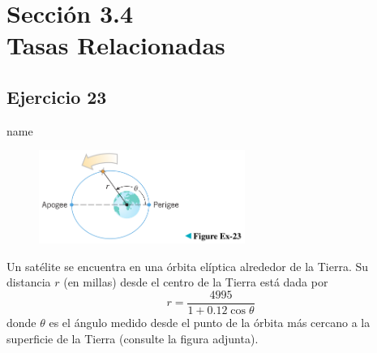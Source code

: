 \documentclass[12pt]{article}
\begin{document}
\section{Sección 3.4 \\ Tasas Relacionadas} 
\subsection{Ejercicio 23} name \\

\begin{figure}[H]
\centering
\includegraphics[width=0.6\textwidth]{../img/img_Lista3/23.png}
\end{figure}
Un satélite se encuentra en una órbita elíptica alrededor de la Tierra. Su distancia $r$ (en millas) desde el centro de la Tierra está dada por
\[
r=\frac{4995}{1+0.12\cos{\theta}}
\]
donde $\theta$ es el ángulo medido desde el punto de la órbita más cercano a la superficie de la Tierra (consulte la figura adjunta).
\end{document}
